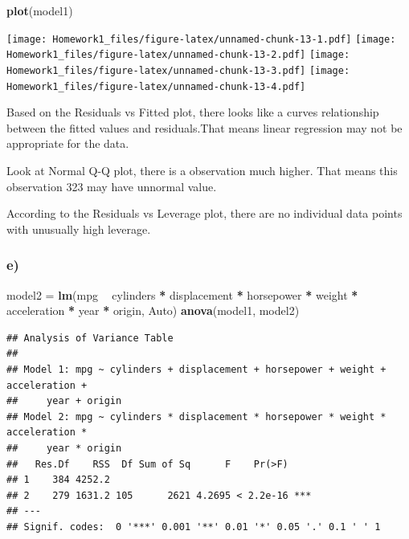 \documentclass[]{article}
\newenvironment{Shaded}{\begin{snugshade}}{\end{snugshade}}
\newcommand{\KeywordTok}[1]{\textcolor[rgb]{0.13,0.29,0.53}{\textbf{#1}}}
\newcommand{\StringTok}[1]{\textcolor[rgb]{0.31,0.60,0.02}{#1}}
\newcommand{\OperatorTok}[1]{\textcolor[rgb]{0.81,0.36,0.00}{\textbf{#1}}}
\newcommand{\NormalTok}[1]{#1}
\begin{document}
\begin{Shaded}
\begin{Highlighting}[]
\KeywordTok{plot}\NormalTok{(model1)}
\end{Highlighting}
\end{Shaded}

\texttt{[image: Homework1\_files/figure-latex/unnamed-chunk-13-1.pdf]}
\texttt{[image: Homework1\_files/figure-latex/unnamed-chunk-13-2.pdf]}
\texttt{[image: Homework1\_files/figure-latex/unnamed-chunk-13-3.pdf]}
\texttt{[image: Homework1\_files/figure-latex/unnamed-chunk-13-4.pdf]}

Based on the Residuals vs Fitted plot, there looks like a curves
relationship between the fitted values and residuals.That means linear
regression may not be appropriate for the data.

Look at Normal Q-Q plot, there is a observation much higher. That means
this observation 323 may have unnormal value.

According to the Residuals vs Leverage plot, there are no individual
data points with unusually high leverage.

\subsubsection{e)}\label{e}

\begin{Shaded}
\begin{Highlighting}[]
\NormalTok{model2 =}\StringTok{ }\KeywordTok{lm}\NormalTok{(mpg }\OperatorTok{~}\StringTok{ }\NormalTok{cylinders }\OperatorTok{*}\StringTok{ }\NormalTok{displacement }\OperatorTok{*}\StringTok{ }\NormalTok{horsepower }\OperatorTok{*}\StringTok{ }\NormalTok{weight }\OperatorTok{*}\StringTok{ }\NormalTok{acceleration }\OperatorTok{*}\StringTok{ }\NormalTok{year }\OperatorTok{*}\StringTok{ }\NormalTok{origin, Auto)}
\KeywordTok{anova}\NormalTok{(model1, model2)}
\end{Highlighting}
\end{Shaded}

\begin{verbatim}
## Analysis of Variance Table
## 
## Model 1: mpg ~ cylinders + displacement + horsepower + weight + acceleration + 
##     year + origin
## Model 2: mpg ~ cylinders * displacement * horsepower * weight * acceleration * 
##     year * origin
##   Res.Df    RSS  Df Sum of Sq      F    Pr(>F)    
## 1    384 4252.2                                   
## 2    279 1631.2 105      2621 4.2695 < 2.2e-16 ***
## ---
## Signif. codes:  0 '***' 0.001 '**' 0.01 '*' 0.05 '.' 0.1 ' ' 1
\end{verbatim}
\end{document}
